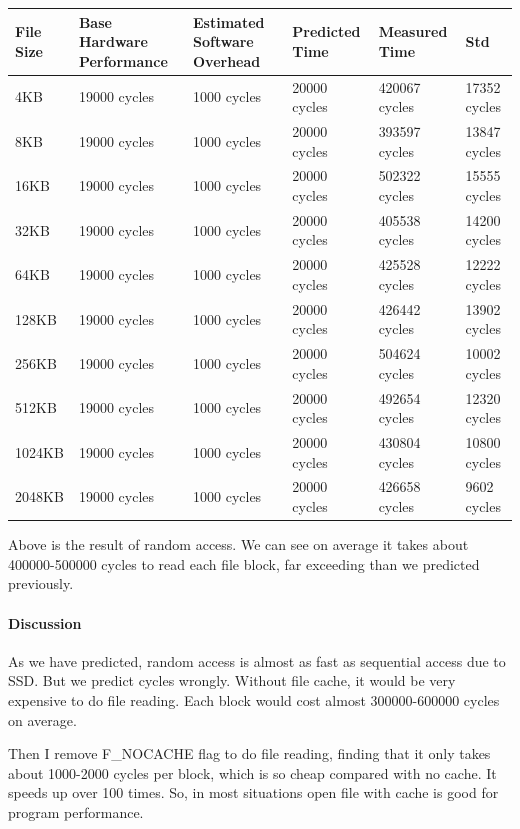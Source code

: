 \begin{center}
\begin{tabular}{| p{2cm} | p{2.5cm} | p{2.5cm} | p{2.5cm} | p{2.5cm} | p{3cm} }
File Size   & Base Hardware Performance  & Estimated Software Overhead  & Predicted Time  & Measured Time  & Std \\
\hline
4KB & 19000 cycles& 1000 cycles& 20000 cycles& 420067 cycles & 17352 cycles\\ 
8KB & 19000 cycles& 1000 cycles& 20000 cycles& 393597 cycles & 13847 cycles\\ 
16KB & 19000 cycles& 1000 cycles& 20000 cycles& 502322 cycles & 15555 cycles\\
32KB & 19000 cycles& 1000 cycles& 20000 cycles& 405538 cycles & 14200 cycles\\
64KB & 19000 cycles& 1000 cycles& 20000 cycles& 425528 cycles & 12222 cycles\\
128KB & 19000 cycles& 1000 cycles& 20000 cycles& 426442 cycles & 13902 cycles \\
256KB & 19000 cycles& 1000 cycles& 20000 cycles& 504624 cycles & 10002 cycles\\
512KB & 19000 cycles& 1000 cycles& 20000 cycles& 492654 cycles & 12320 cycles \\
1024KB & 19000 cycles& 1000 cycles& 20000 cycles& 430804 cycles & 10800 cycles\\
2048KB & 19000 cycles& 1000 cycles& 20000 cycles& 426658 cycles & 9602 cycles \\

\end{tabular}
\end{center}

Above is the result of random access. We can see on average it takes about 400000-500000 cycles to read each file block, far exceeding than we predicted previously.

\paragraph{Discussion}
As we have predicted, random access is almost as fast as sequential access due to SSD. But we predict cycles wrongly. Without file cache, it would be very expensive to do file reading. Each block would cost almost 300000-600000 cycles on average.

Then I remove F\_NOCACHE flag to do file reading, finding that it only takes about 1000-2000 cycles per block, which is so cheap compared with no cache. It speeds up over 100 times. So, in most situations open file with cache is good for program performance.

